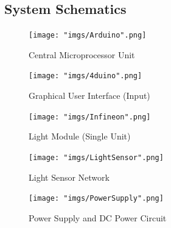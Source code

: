\documentclass[12pt,a4paper]{report}
\begin{document}
\subsection{System Schematics}
\begin{figure}[H]
	\centering
	\texttt{[image: "imgs/Arduino".png]}\par			\vspace{0.1cm}
	\caption{Central Microprocessor Unit}
\end{figure}
\newpage
\begin{figure}[H]
	\centering
	\texttt{[image: "imgs/4duino".png]}\par			\vspace{0.1cm}
	\caption{Graphical User Interface (Input)}
\end{figure}
\newpage
\begin{figure}[H]
	\centering
	\texttt{[image: "imgs/Infineon".png]}\par			\vspace{0.1cm}
	\caption{Light Module (Single Unit)}
\end{figure}
\newpage
\begin{figure}[H]
	\centering
	\texttt{[image: "imgs/LightSensor".png]}\par			\vspace{0.1cm}
	\caption{Light Sensor Network}
\end{figure}
\newpage
\begin{figure}[H]
	\centering
	\texttt{[image: "imgs/PowerSupply".png]}\par			\vspace{0.1cm}
	\caption{Power Supply and DC Power Circuit}
\end{figure}
\newpage











\setcounter{section}{8}
\end{document}
